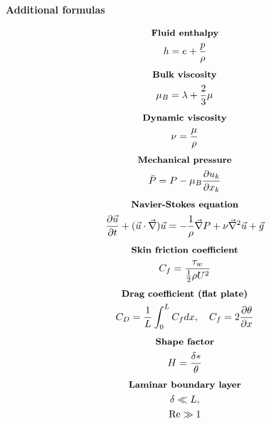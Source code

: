 \documentclass[10pt, a4paper]{article}
\newcommand{\derivative}[2]{\frac{\partial #1}{\partial #2}}
\begin{document}
\begin{center}
    \Large
    \textbf{Additional formulas}
    \vspace{0.5cm}
\end{center}
\begin{multicols*}{2}
    \begin{gather*}
        \textbf{\small Fluid enthalpy} \\
        h = e + \frac{p}{\rho}
    \end{gather*}
    \begin{gather*}
        \textbf{\small Bulk viscosity} \\
        \mu_B = \lambda + \frac23 \mu
    \end{gather*}
    \begin{gather*}
        \textbf{\small Dynamic viscosity} \\
        \nu = \frac{\mu}{\rho}
    \end{gather*}
    \begin{gather*}
        \textbf{\small Mechanical pressure} \\
        \bar{P} = P - \mu_B\derivative{u_k}{x_k}
    \end{gather*}
    \begin{gather*}
        \textbf{\small Navier-Stokes equation} \\
        \derivative{ \vec{u}}{t} + (\vec{u}\cdot \vec{\nabla})\vec{u} =
        -\frac{1}{\rho}\vec{\nabla}P + \nu \vec{\nabla}^2 \vec{u} + \vec{g}
    \end{gather*}
    \begin{gather*}
        \textbf{\small Skin friction coefficient} \\
        C_f = \frac{\tau_w}{\frac12 \rho U^2}
    \end{gather*}
    \begin{gather*}
        \textbf{\small Drag coefficient (flat plate)} \\
        C_D = \frac{1}{L}\int_0^L C_f dx, \quad C_f = 2\derivative{ \theta}{x}
    \end{gather*}
    \begin{gather*}
        \textbf{\small Shape factor} \\
        H = \frac{\delta *}{\theta}
    \end{gather*}
    \begin{gather*}
        \textbf{\small Laminar boundary layer} \\
        \delta \ll L, \\
        \text{Re} \gg 1

\end{gather*}
\end{multicols*}
\end{document}
